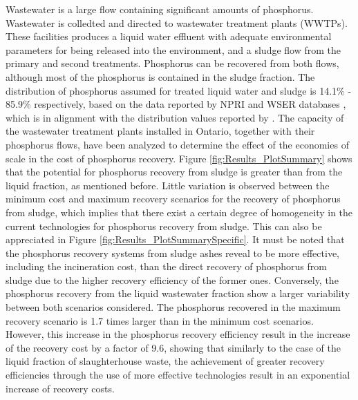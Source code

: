\documentclass[authoryear]{elsarticle}
\begin{document}
Wastewater is a large flow containing significant amounts of phosphorus. Wastewater is colledted and directed to wastewater treatment plants (WWTPs). These facilities produces a liquid water effluent with adequate environmental parameters for being released into the environment, and a sludge flow from the primary and second treatments. Phosphorus can be recovered from both flows, although most of the phosphorus is contained in the sludge fraction.
The distribution of phosphorus assumed for treated liquid water and sludge is 14.1\% - 85.9\% respectively,
based on the data reported by NPRI and WSER databases \citep{NPRI, WSER}, which is in alignment with the distribution values reported by \citet{egle_phosphorus_2016}. The capacity of the wastewater treatment plants installed in Ontario, together with their phosphorus flows, have been analyzed to determine the effect of the economies of scale in the cost of phosphorus recovery.
Figure \ref{fig:Results_PlotSummary} shows that the potential for phosphorus recovery from sludge is greater than from the liquid fraction, as mentioned before. Little variation is observed between the minimum cost and maximum recovery scenarios for the recovery of phosphorus from sludge, which implies that there exist a certain degree of homogeneity in the current technologies for phosphorus recovery from sludge. This can also be appreciated in Figure \ref{fig:Results_PlotSummarySpecific}. It must be noted that the phosphorus recovery systems from sludge ashes reveal to be more effective, including the incineration cost, than the direct recovery of phosphorus from sludge due to the higher recovery efficiency of the former ones. Conversely, the phosphorus recovery from the liquid wastewater fraction show a larger variability between both scenarios considered. The phosphorus recovered in the maximum recovery scenario is 1.7 times larger than in the minimum cost scenarios. However, this increase in the phosphorus recovery efficiency result in the increase of the recovery cost by a factor of 9.6, showing that similarly to the case of the liquid fraction of slaughterhouse waste, the achievement of greater recovery efficiencies through the use of more effective technologies result in an exponential increase of recovery costs.
\end{document}
